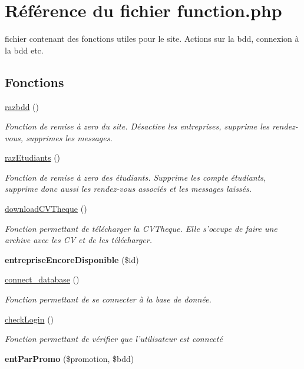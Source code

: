 \hypertarget{function_8php}{\section{Référence du fichier function.\-php}
\label{function_8php}
}


fichier contenant des fonctions utiles pour le site. Actions sur la bdd, connexion à la bdd etc.  


\subsection*{Fonctions}
\begin{DoxyCompactItemize}
\item 
\hyperlink{function_8php_a03c93c7f5fb072f73ce3708919a866a8}{razbdd} ()
\begin{DoxyCompactList}\small\item\em Fonction de remise à zero du site. Désactive les entreprises, supprime les rendez-\/vous, supprimes les messages. \end{DoxyCompactList}\item 
\hyperlink{function_8php_a7d4f9fc4bec979b07f55f932d37d54a8}{raz\-Etudiants} ()
\begin{DoxyCompactList}\small\item\em Fonction de remise à zero des étudiants. Supprime les compte étudiants, supprime donc aussi les rendez-\/vous associés et les messages laissés. \end{DoxyCompactList}\item 
\hyperlink{function_8php_a84f5d05a79bfe6359f8567c9e758131d}{download\-C\-V\-Theque} ()
\begin{DoxyCompactList}\small\item\em Fonction permettant de télécharger la C\-V\-Theque. Elle s'occupe de faire une archive avec les C\-V et de les télécharger. \end{DoxyCompactList}\item 
\hypertarget{function_8php_afedf546732a97f1d7f7b051519ecdb6b}{{\bfseries entreprise\-Encore\-Disponible} (\$id)}\label{function_8php_afedf546732a97f1d7f7b051519ecdb6b}

\item 
\hyperlink{function_8php_a1f56f7efe8c1222675d8715c259957d5}{connect\-\_\-database} ()
\begin{DoxyCompactList}\small\item\em Fonction permettant de se connecter à la base de donnée. \end{DoxyCompactList}\item 
\hyperlink{function_8php_ab8e90adf3e4b15eea283c4ea450a4288}{check\-Login} ()
\begin{DoxyCompactList}\small\item\em Fonction permettant de vérifier que l'utilisateur est connecté \end{DoxyCompactList}\item 
\hypertarget{function_8php_aa9bba2e669d4e2612a16cf05b84ff3e6}{{\bfseries ent\-Par\-Promo} (\$promotion, \$bdd)}\label{function_8php_aa9bba2e669d4e2612a16cf05b84ff3e6}


\end{DoxyCompactItemize}

